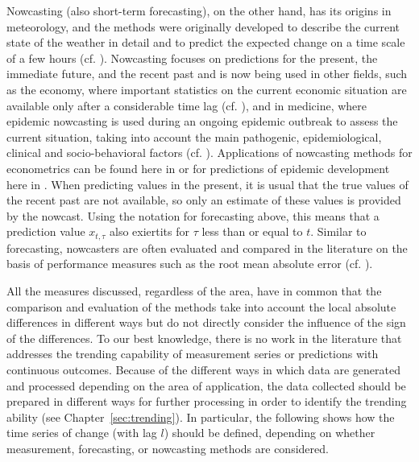 Nowcasting (also short-term forecasting), on the other hand, has its origins in meteorology, and the methods were originally developed to describe the current state of the weather in detail and to predict the expected change on a time scale of a few hours (cf. \cite{browning1989nowcasting,schmid2019nowcasting}).
Nowcasting focuses on predictions for the present, the immediate future, and the recent past and is now being used in other fields, such as the economy, where important statistics on the current economic situation are available only after a considerable time lag (cf. \cite{banbura2013now}), and in medicine, where epidemic nowcasting is used during an ongoing epidemic outbreak to assess the current situation, taking into account the main pathogenic, epidemiological, clinical and socio-behavioral factors (cf. \cite{wu2021nowcasting}). 
Applications of nowcasting methods for econometrics can be found here in \cite{giannone2006nowcasting,fornaro2020nowcasting,bok2018macroeconomic} or for predictions of epidemic development here in \cite{johansson2014nowcasting,gunther2021nowcasting,birrell2021real}. 
When predicting values in the present, it is usual that the true values of the recent past are not available, so only an estimate of these values is provided by the nowcast.
Using the notation for forecasting above, this means that a prediction value $x_{t,\tau}$ also exiertits  for $\tau$ less than or equal to $t$.
Similar to forecasting, nowcasters are often evaluated and compared in the literature on the basis of performance measures such as the root mean absolute error (cf. \cite{gunther2021nowcasting}).

All the measures discussed, regardless of the area, have in common that the comparison and evaluation of the methods take into account the local absolute differences in different ways but do not directly consider the influence of the sign of the differences. 
To our best knowledge, there is no work in the literature that addresses the trending capability of measurement series or predictions with continuous outcomes.
Because of the different ways in which data are generated and processed depending on the area of application, the data collected should be prepared in different ways for further processing in order to identify the trending ability (see Chapter~\ref{sec:trending}). 
In particular, the following shows how the time series of change (with lag $l$) should be defined, depending on whether measurement, forecasting, or nowcasting methods are considered.

